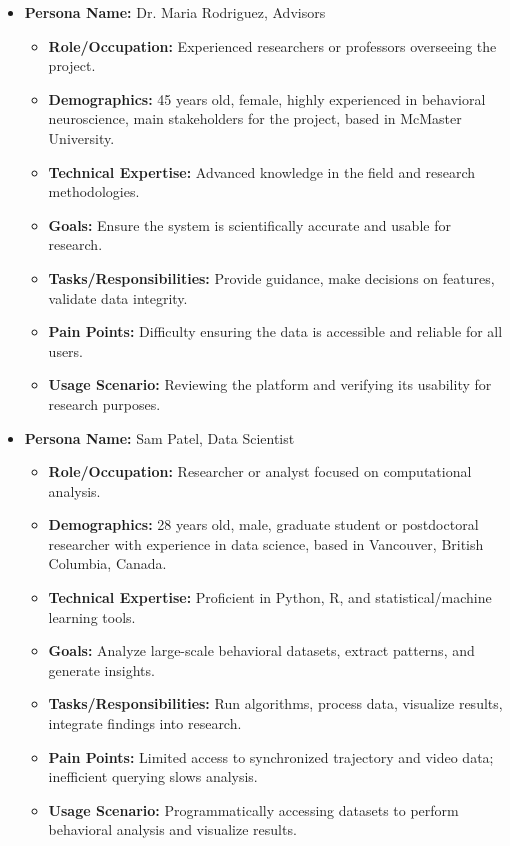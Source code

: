 \documentclass[12pt]{article}
\begin{document}
\begin{itemize}
    \item \textbf{Persona Name:} Dr. Maria Rodriguez, Advisors
    \begin{itemize}
        \item \textbf{Role/Occupation:} Experienced researchers or professors overseeing the project.
        \item \textbf{Demographics:} 45 years old, female, highly experienced in behavioral neuroscience, main stakeholders for the project, based in McMaster University.
        \item \textbf{Technical Expertise:} Advanced knowledge in the field and research methodologies.
        \item \textbf{Goals:} Ensure the system is scientifically accurate and usable for research.
        \item \textbf{Tasks/Responsibilities:} Provide guidance, make decisions on features, validate data integrity.
        \item \textbf{Pain Points:} Difficulty ensuring the data is accessible and reliable for all users.
        \item \textbf{Usage Scenario:} Reviewing the platform and verifying its usability for research purposes.
    \end{itemize}

    \item \textbf{Persona Name:} Sam Patel, Data Scientist
    \begin{itemize}
        \item \textbf{Role/Occupation:} Researcher or analyst focused on computational analysis.
        \item \textbf{Demographics:} 28 years old, male, graduate student or postdoctoral researcher with experience in data science, based in Vancouver, British Columbia, Canada.
        \item \textbf{Technical Expertise:} Proficient in Python, R, and statistical/machine learning tools.
        \item \textbf{Goals:} Analyze large-scale behavioral datasets, extract patterns, and generate insights.
        \item \textbf{Tasks/Responsibilities:} Run algorithms, process data, visualize results, integrate findings into research.
        \item \textbf{Pain Points:} Limited access to synchronized trajectory and video data; inefficient querying slows analysis.
        \item \textbf{Usage Scenario:} Programmatically accessing datasets to perform behavioral analysis and visualize results.
    \end{itemize}
\end{itemize}
\end{document}
